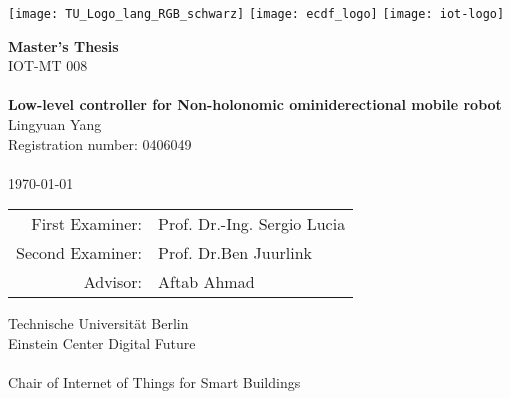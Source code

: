 \begin{titlepage}
		\texttt{[image: TU\_Logo\_lang\_RGB\_schwarz]}
\hfill
			\texttt{[image: ecdf\_logo]}
			\texttt{[image: iot-logo]}
    \begin{center}
			\vspace{2mm}
    \vfill
      \Large\textbf{Master's Thesis}\\
             \normalsize IOT-MT 008 %
			\LARGE \\~\\
      \textbf{Low-level controller for Non-holonomic ominiderectional mobile robot}\\
    \vspace{\fill}
      \Large Lingyuan Yang\\
      \small Registration number: 0406049\\
       ~\\
       \today \\
		\vfill
		  \normalsize
			\begin{tabular}{rl}
				First Examiner: & Prof. Dr.-Ing. Sergio Lucia\tabularnewline
				Second Examiner: & Prof. Dr.Ben Juurlink \tabularnewline
                Advisor:   & Aftab Ahmad\tabularnewline
			\end{tabular}
    \vfill
      \small  {}
			Technische Universit\"at Berlin\\
			Einstein Center Digital Future\\
			~\\
			{Chair of Internet of Things for Smart Buildings}\\

\end{center}
\end{titlepage}
